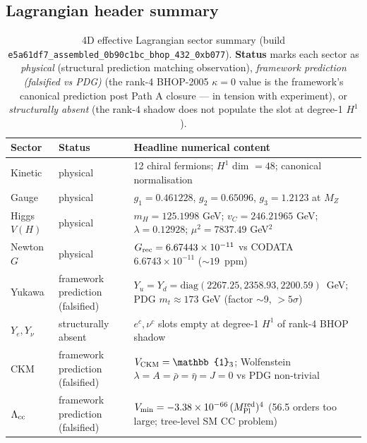 ﻿\documentclass[reprint,amsmath,amssymb,aps,prd,longbibliography,floatfix]{revtex4-2}
\begin{document}
\subsection{Lagrangian header summary}

\begin{table}[t]
\centering
\caption{4D effective Lagrangian sector summary
(build \texttt{e5a61df7\_assembled\_0b90c1bc\_bhop\_432\_0xb077}).
\textbf{Status} marks each sector as
\emph{physical} (structural prediction matching observation),
\emph{framework prediction (falsified vs PDG)} (the rank-4 BHOP-2005
$\kappa=0$ value is the framework's canonical prediction post Path A
closure --- in tension with experiment), or
\emph{structurally absent} (the rank-4 shadow does not populate the
slot at degree-1 $H^1$).}
\label{tab:stage4-lagrangian-summary}
\small
\begin{tabular}{lll}
\toprule
Sector & Status & Headline numerical content \\
\midrule
Kinetic            & physical                          & 12 chiral fermions; $H^1$ dim $= 48$; canonical normalisation \\
Gauge              & physical                          & $g_1 = 0.461228$, $g_2 = 0.65096$, $g_3 = 1.2123$ at $M_Z$ \\
Higgs $V(H)$       & physical                          & $m_H = 125.1998$ GeV; $v_C = 246.21965$ GeV; $\lambda = 0.12928$; $\mu^2 = 7837.49$ GeV$^2$ \\
Newton $G$         & physical                          & $G_{\rm rec} = 6.67443 \times 10^{-11}$ vs CODATA $6.6743 \times 10^{-11}$ ($\sim 19$~ppm) \\
Yukawa             & framework prediction (falsified)  & $Y_u = Y_d = \mathrm{diag}(2267.25, 2358.93, 2200.59)$~GeV; PDG $m_t \approx 173$ GeV (factor $\sim$9, $>5\sigma$) \\
$Y_e, Y_\nu$       & structurally absent               & $e^c, \nu^c$ slots empty at degree-1 $H^1$ of rank-4 BHOP shadow \\
CKM                & framework prediction (falsified)  & $V_{\rm CKM} = \mathbb{1}_3$; Wolfenstein $\lambda = A = \bar\rho = \bar\eta = J = 0$ vs PDG non-trivial \\
$\Lambda_{\rm cc}$ & framework prediction (falsified)  & $V_{\min} = -3.38 \times 10^{-66}\,(M_{\rm Pl}^{\rm red})^4$ (56.5 orders too large; tree-level SM CC problem) \\
\bottomrule
\end{tabular}
\end{table}
\end{document}
